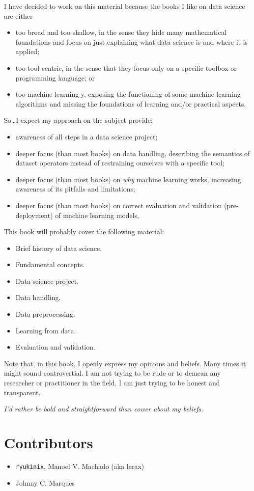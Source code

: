 I have decided to work on this material because the books I like on data science are
either
\begin{itemize}
  \item too broad and too shallow, in the sense they hide many mathematical foundations
    and focus on just explaining what data science is and where it is applied;
  \item too tool-centric, in the sense that they focus only on a specific toolbox or
    programming language; or
  \item too machine-learning-y, exposing the functioning of some machine learning
    algorithms and missing the foundations of learning and/or practical aspects.
\end{itemize}

So\dots I expect my approach on the subject provide:
\begin{itemize}
  \item awareness of all steps in a data science project;
  \item deeper focus (than most books) on data handling, describing the semantics of dataset
    operators instead of restraining ourselves with a specific tool;
  \item deeper focus (than most books) on \emph{why} machine learning works, increasing awareness of its pitfalls and
    limitations;
  \item deeper focus (than most books) on correct evaluation and validation
    (pre-deployment) of machine learning models.
\end{itemize}

This book will probably cover the following material:
\begin{itemize}
  \item Brief history of data science.
  \item Fundamental concepts.
  \item Data science project.
  \item Data handling.
  \item Data preprocessing.
  \item Learning from data.
  \item Evaluation and validation.
\end{itemize}

Note that, in this book, I openly express my opinions and beliefs. Many times it might sound
controvertial.  I am not trying to be rude or to demean any researcher or practitioner in the
field.  I am just trying to be honest and transparent.

\emph{I'd rather be bold and straightforward than cower about my beliefs.}

\section*{Contributors}

\begin{itemize}
    \itemsep0em
    \item \texttt{ryukinix}, Manoel V. Machado (aka lerax)
    \item Johnny C. Marques
\end{itemize}

